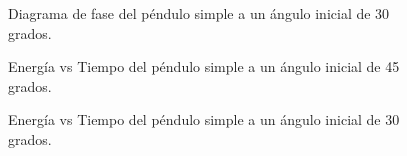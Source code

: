 \documentclass[aps,twocolumn,secnumarabic,nobalancelastpage,amsmath,amssymb,nofootinbib]{revtex4-1}
\begin{document}
		\begin{figure}[!htb]
			\caption{Diagrama de fase del p\'endulo simple a un \'angulo inicial de 30 grados.}
			\label{fig:DiagramaFase30}
		\end{figure} 
	
		\begin{figure}[!htb]
			\caption{Energ\'ia vs Tiempo del p\'endulo simple a un \'angulo inicial de 45 grados.}
			\label{fig:EnergiaTiempo45}
		\end{figure} 
		
		\begin{figure}[!htb]
			\caption{Energ\'ia vs Tiempo del p\'endulo simple a un \'angulo inicial de 30 grados.}
			\label{fig:EnergiaTiempo30}
		\end{figure}
	
\end{document}
